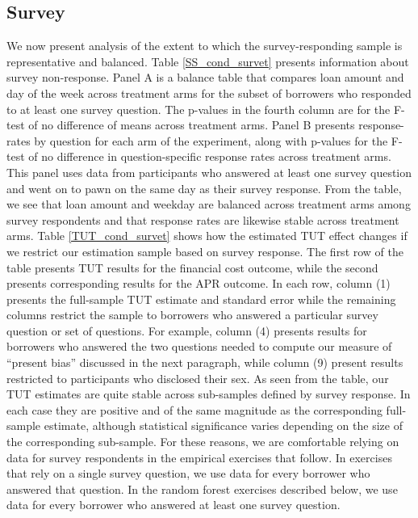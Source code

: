 \newpage
\subsection{Survey}   \label{app:survey_data}

\vspace{.2in}

\normalsize
\linespread{1.25}
\normalsize
\linespread{1.25}

We now present analysis of the extent to which the survey-responding sample is representative and balanced.
Table \ref{SS_cond_survet} presents information about survey non-response.
Panel A is a balance table that compares loan amount and day of the week across treatment arms for the subset of borrowers who responded to at least one survey question.
The p-values in the fourth column are for the F-test of no difference of means across treatment arms. 
Panel B presents response-rates by question for each arm of the experiment, along with p-values for the F-test of no difference in question-specific response rates across treatment arms. 
This panel uses data from participants who answered at least one survey question and went on to pawn on the same day as their survey response.
From the table, we see that loan amount and weekday are balanced across treatment arms among survey respondents and that response rates are likewise stable across treatment arms.
Table \ref{TUT_cond_survet} shows how the estimated TUT effect changes if we restrict our estimation sample based on survey response.
The first row of the table presents TUT results for the financial cost outcome, while the second presents corresponding results for the APR outcome.
In each row, column (1) presents the full-sample TUT estimate and standard error while the remaining columns restrict the sample to borrowers who answered a particular survey question or set of questions.
For example, column (4) presents results for borrowers who answered the two questions needed to compute our measure of ``present bias'' discussed in the next paragraph, while column (9) present results restricted to participants who disclosed their sex. 
As seen from the table, our TUT estimates are quite stable across sub-samples defined by survey response.
In each case they are positive and of the same magnitude as the corresponding full-sample estimate, although statistical significance varies depending on the size of the corresponding sub-sample. 
For these reasons, we are comfortable relying on data for survey respondents in the empirical exercises that follow.
In exercises that rely on a single survey question, we use data for every borrower who answered that question.
In the random forest exercises described below, we use data for every borrower who answered at least one survey question.


